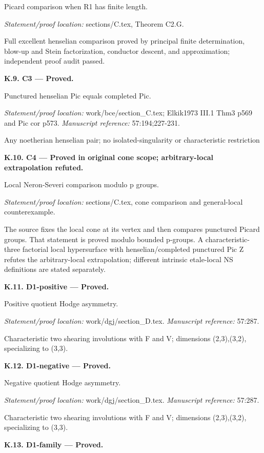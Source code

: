 Picard comparison when R1 has finite length.
\par\emph{Statement/proof location:} sections/C.tex, Theorem C2.G.
\par Full excellent henselian comparison proved by principal finite determination, blow-up and Stein factorization, conductor descent, and approximation; independent proof audit passed.
\par\medskip\noindent\textbf{K.9. C3 --- Proved.}\par
Punctured henselian Pic equals completed Pic.
\par\emph{Statement/proof location:} work/bce/section\_C.tex; Elkik1973 III.1 Thm3 p569 and Pic cor p573.
\emph{Manuscript reference:} 57:194;227-231.
\par Any noetherian henselian pair; no isolated-singularity or characteristic restriction
\par\medskip\noindent\textbf{K.10. C4 --- Proved in original cone scope; arbitrary-local extrapolation refuted.}\par
Local Neron-Severi comparison modulo p groups.
\par\emph{Statement/proof location:} sections/C.tex, cone comparison and general-local counterexample.
\par The source fixes the local cone at its vertex and then compares punctured Picard groups. That statement is proved modulo bounded p-groups. A characteristic-three factorial local hypersurface with henselian/completed punctured Pic Z refutes the arbitrary-local extrapolation; different intrinsic etale-local NS definitions are stated separately.
\par\medskip\noindent\textbf{K.11. D1-positive --- Proved.}\par
Positive quotient Hodge asymmetry.
\par\emph{Statement/proof location:} work/dgj/section\_D.tex.
\emph{Manuscript reference:} 57:287.
\par Characteristic two shearing involutions with F and V; dimensions (2,3),(3,2), specializing to (3,3).
\par\medskip\noindent\textbf{K.12. D1-negative --- Proved.}\par
Negative quotient Hodge asymmetry.
\par\emph{Statement/proof location:} work/dgj/section\_D.tex.
\emph{Manuscript reference:} 57:287.
\par Characteristic two shearing involutions with F and V; dimensions (2,3),(3,2), specializing to (3,3).
\par\medskip\noindent\textbf{K.13. D1-family --- Proved.}\par
